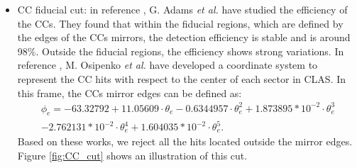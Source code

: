 \begin{itemize}
\begin{itemize}
\item CC fiducial cut: in reference \cite{CCref}, G. Adams {\it et al.} have studied the efficiency of the CCs. They found that within the fiducial regions, which are defined by the edges of the CCs mirrors, the detection efficiency is stable and is around 98$\%$. Outside the fiducial regions, the efficiency shows strong variations. In reference \cite{Osipenko}, M. Osipenko {\it et al.} have developed a coordinate system to represent the CC hits with respect to the center of each sector in CLAS. In this frame, the CCs mirror edges can be defined as:\\
\begin{multline}  
\phi_{e}  = -63.32792 +11.05609\cdot \theta_{e} -0.6344957\cdot \theta^{2}_{e} +1.873895*10^{-2}\cdot \theta^{3}_{e} \\
- 2.762131*10^{-2}\cdot \theta^{4}_{e}+1.604035*10^{-2}\cdot \theta^{5}_{e}. ~~~~~~~~~~~~~~~~~~~~~~~~~
\end{multline}
Based on these works, we reject all the hits located outside the mirror edges. Figure \ref{fig:CC_cut} shows an illustration of this cut.




\end{itemize}
\end{itemize}
